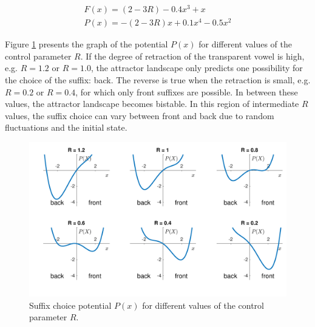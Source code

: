 \begin{equation}
\begin{split}
F(x) = (2-3R) - 0.4 x^3 + x\\
P(x) = -(2-3R)x + 0.1 x^4 - 0.5 x^2
\end{split}
\label{eq:gafos_benus_vowel_harmony_force_potential}
\end{equation}

Figure \ref{fig:gafos_benus_suffix_potential} presents the graph of the potential $P(x)$ for different values of the control parameter $R$. If the degree of retraction of the transparent vowel is high, e.g. $R = 1.2$ or $R = 1.0$, the attractor landscape only predicts one possibility for the choice of the suffix: back. The reverse is true when the retraction is small, e.g. $R = 0.2$ or $R = 0.4$, for which only front suffixes are possible. In between these values, the attractor landscape becomes bistable. In this region of intermediate $R$ values, the suffix choice can vary between front and back due to random fluctuations and the initial state.

\begin{figure}[hptb]
\begin{center}
\includegraphics[width=\textwidth]{figures/ch3/gafos_benus_suffix_potential.pdf}
\caption{Suffix choice potential $P(x)$ for different values of the control parameter $R$.}
\label{fig:gafos_benus_suffix_potential}
\end{center}
\end{figure}

